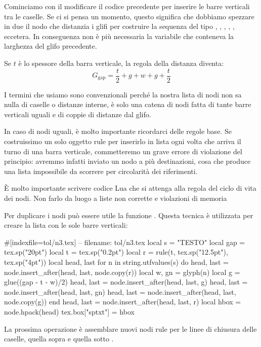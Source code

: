 Cominciamo con il modificare il codice precedente per inserire le barre
verticali tra le caselle. Se ci si pensa un momento, questo significa che
dobbiamo spezzare in due il nodo che distanzia i glifi per costruire la sequenza
del tipo , , , , ,
eccetera. In conseguenza non è più necessaria la variabile  che
conteneva la larghezza del glifo precedente.

Se \( t \) è lo spessore della barra verticale, la regola della distanza
diventa:
\[
    G_\mathrm{gap} = \frac{t}{2} + g + w + g + \frac{t}{2}
\]

I termini che usiamo sono convenzionali perché la nostra lista di nodi non sa
nulla di caselle o distanze interne, è solo una catena di nodi fatta di tante
barre verticali uguali e di coppie di distanze dal glifo.

In caso di nodi uguali, è molto importante ricordarci delle regole base. Se
costruissimo un solo oggetto rule per inserirlo in lista ogni volta che arriva
il turno di una barra verticale, commetteremo un grave errore di violazione del
principio: avremmo infatti inviato un nodo a più destinazioni, cosa che produce
una lista impossibile da scorrere per circolarità dei riferimenti.

È molto importante scrivere codice Lua che si attenga alla regola del ciclo di
vita dei nodi. Non farlo da luogo a liste non corrette e violazioni di memoria

Per duplicare i nodi può essere utile la funzione
. Questa tecnica è utilizzata per creare la
lista con le sole barre verticali:
\begin{lines}
#[indexfile=tol/n3.tex]
-- filename: tol/n3.tex
local s = "TESTO"
local gap = tex.sp("20pt")
local t = tex.sp("0.2pt")
local r = rule(t, tex.sp("12.5pt"), tex.sp("4pt"))
local head, last
for n in string.utfvalues(s) do
    head, last = node.insert_after(head, last, node.copy(r))
    local w, gn = glyph(n)
    local g = glue((gap - t - w)/2)
    head, last = node.insert_after(head, last, g)
    head, last = node.insert_after(head, last, gn)
    head, last = node.insert_after(head, last, node.copy(g))
end
head, last = node.insert_after(head, last, r)
local hbox = node.hpack(head)
tex.box["sptxt"] = hbox
\end{lines}

La prossima operazione è assemblare nuovi nodi rule per le linee di chiusura
delle caselle, quella sopra  e quella sotto .

